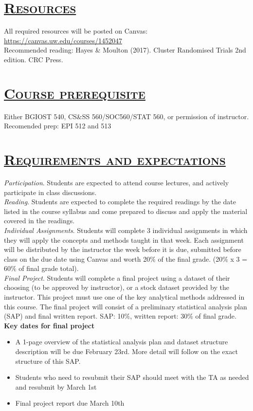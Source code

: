 \documentclass[fancyhdr,10pt]{article}
\begin{document}
\section*{\underline{\textsc{Resources}}}
All required resources will be posted on Canvas: \url{https://canvas.uw.edu/courses/1452047}\\

Recommended reading: Hayes \& Moulton (2017). Cluster Randomised Trials 2nd edition. CRC Press.

\section*{\underline{\textsc{Course prerequisite}}}
Either BGIOST 540, CS\&SS 560/SOC560/STAT 560, or permission of instructor. Recomended prep: EPI 512 and 513

\section*{\underline{\textsc{Requirements and expectations}}}

\textit{Participation}. Students are expected to attend course lectures, and actively participate in class discussions.\\

\textit{Reading}. Students are expected to complete the required readings by the date listed in the course syllabus and come prepared to discuss and apply the material covered in the readings.\\

\textit{Individual Assignments}. Students will complete 3 individual assignments in which they will apply the concepts and methods taught in that week. Each assignment will be distributed by the instructor the week before it is due, submitted before class on the due date using Canvas and worth 20$\%$ of the final grade. (20$\%$ x 3 = 60$\%$ of final grade total).\\

\textit{Final Project}. Students will complete a final project using a dataset of their choosing (to be approved by instructor), or a stock dataset provided by the instructor. This project must use one of the key analytical methods addressed in this course. The final project will consist of a preliminary statistical analysis plan (SAP) and final written report.  SAP: 10$\%$, written report: 30$\%$ of final grade.\\

\textbf{Key dates for final project}
\begin{itemize}
 \item A 1-page overview of the statistical analysis plan and dataset structure description will be due February 23rd. More detail will follow on the exact structure of this SAP.
 \item Students who need to resubmit their SAP should meet with the TA as needed and resubmit by March 1st
 \item Final project report due March 10th
\end{itemize}
\end{document}
